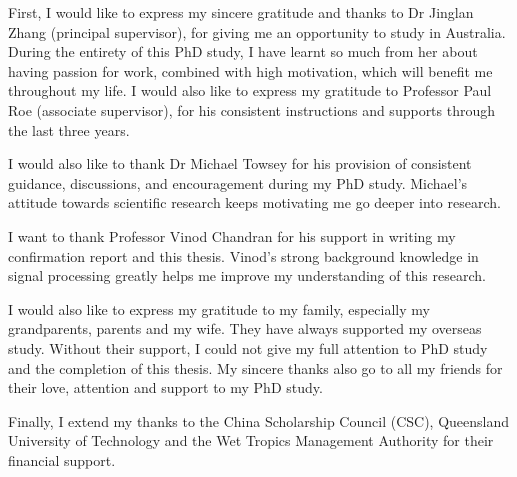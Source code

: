 \begin{ack}
First, I would like to express my sincere gratitude and thanks to Dr Jinglan Zhang (principal supervisor), for giving me an opportunity to study in Australia. During the entirety of this PhD study, I have learnt so much from her about having passion for work, combined with high motivation, which will benefit me throughout my life. 
I would also like to express my gratitude to Professor Paul Roe (associate supervisor), for his consistent instructions and supports through the last three years.  

I would also like to thank Dr Michael Towsey for his provision of consistent guidance, discussions, and encouragement during my PhD study. Michael's attitude towards scientific research keeps motivating me go deeper into research.  


I want to thank Professor Vinod Chandran for his support in writing my confirmation report and this thesis. Vinod's strong background knowledge in signal processing greatly helps me improve my understanding of this research.

I would also like to express my gratitude to my family, especially my grandparents, parents and my wife. They have always supported my overseas study. Without their support, I could not give my full attention to PhD study and  the completion of this thesis. 
My sincere thanks also go to all my friends for their love, attention and support to my PhD study. 

Finally, I extend my thanks to the China Scholarship Council (CSC), Queensland University of Technology and the Wet Tropics Management Authority for their financial support. 

\end{ack}





\afterpreface
